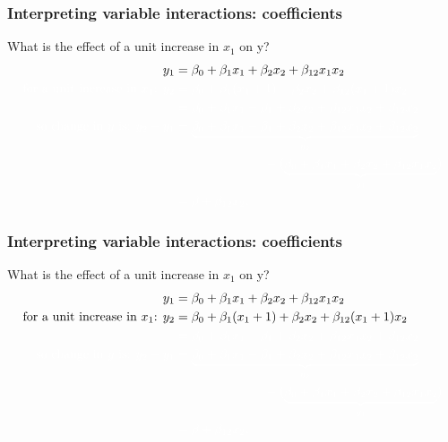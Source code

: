 \documentclass[aspectratio=169]{beamer}
\theoremstyle{principle}
\begin{document}
\begin{frame}
\frametitle{Interpreting variable interactions: coefficients}

What is the effect of a unit increase in $x_1$ on y?
\begin{align*}
y_1 &= \beta_0 + \beta_1x_1 + \beta_2x_2 + \beta_{12}x_1x_2\\
\color{white}\mbox{for a unit increase in $x_1$: } y_2 &\color{white}= \beta_0 + \beta_1(x_1 + 1) + \beta_2x_2 + \beta_{12}(x_1 + 1)x_2\\
\color{white}&\color{white}= \beta_0 + \beta_1x_1 + \beta_1 + \beta_2x_2 + \beta_{12}x_1x_2 + \beta_{12}x_2\\
\color{white}\mbox{so change in $y$ is: }y_2 - y_1 &\color{white}= \underbrace{\beta_0 + \beta_1x_1 + \beta_1 + \beta_2x_2 + \beta_{12}x_1x_2 + \beta_{12}x_2}_{y_2}\\
\color{white}&\color{white}\hspace{25mm} - (\underbrace{\beta_0 + \beta_1x_1 + \beta_2x_2 + \beta_{12}x_1x_2}_{y_1})\\
\color{white}&\color{white}= \beta + \beta_{12}x_2.
\end{align*}

\end{frame}


\begin{frame}
\frametitle{Interpreting variable interactions: coefficients}

What is the effect of a unit increase in $x_1$ on y?
\begin{align*}
y_1 &= \beta_0 + \beta_1x_1 + \beta_2x_2 + \beta_{12}x_1x_2\\
\mbox{for a unit increase in $x_1$: } y_2 &= \beta_0 + \beta_1(x_1 + 1) + \beta_2x_2 + \beta_{12}(x_1 + 1)x_2\\
\color{white}&\color{white}= \beta_0 + \beta_1x_1 + \beta_1 + \beta_2x_2 + \beta_{12}x_1x_2 + \beta_{12}x_2\\
\color{white}\mbox{so change in $y$ is: }y_2 - y_1 &\color{white}= \underbrace{\beta_0 + \beta_1x_1 + \beta_1 + \beta_2x_2 + \beta_{12}x_1x_2 + \beta_{12}x_2}_{y_2}\\
\color{white}&\color{white}\hspace{25mm} - (\underbrace{\beta_0 + \beta_1x_1 + \beta_2x_2 + \beta_{12}x_1x_2}_{y_1})\\
\color{white}&\color{white}= \beta + \beta_{12}x_2.
\end{align*}

\end{frame}
\end{document}
